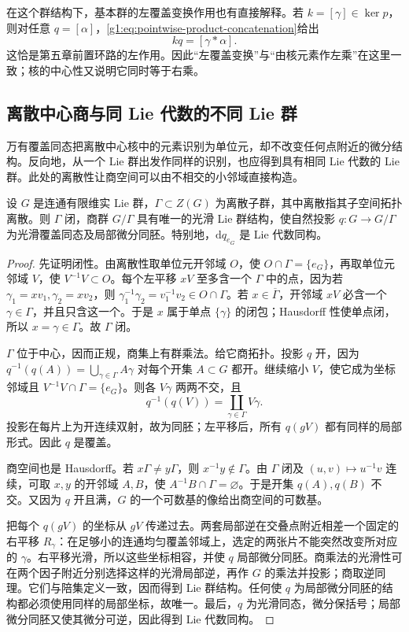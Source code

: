 

在这个群结构下，基本群的左覆盖变换作用也有直接解释。若 \(k=[\gamma]\in\ker p\)，则对任意 \(q=[\alpha]\)，\eqref{g1:eq:pointwise-product-concatenation}给出
\[
	kq=[\gamma*\alpha].
\]
这恰是第五章前置环路的左作用。因此“左覆盖变换”与“由核元素作左乘”在这里一致；核的中心性又说明它同时等于右乘。

\subsection{离散中心商与同 Lie 代数的不同 Lie 群}
\label{g1:subsec:1604:05}

万有覆盖同态把离散中心核中的元素识别为单位元，却不改变任何点附近的微分结构。反向地，从一个 Lie 群出发作同样的识别，也应得到具有相同 Lie 代数的 Lie 群。此处的离散性让商空间可以由不相交的小邻域直接构造。

\begin{proposition}
	\label{g1:prop:discrete-central-quotient}
	设 \(G\) 是连通有限维实 Lie 群，\(\Gamma\subset Z(G)\) 为离散子群，其中离散指其子空间拓扑离散。则 \(\Gamma\) 闭，商群 \(G/\Gamma\) 具有唯一的光滑 Lie 群结构，使自然投影 \(q:G\to G/\Gamma\) 为光滑覆盖同态及局部微分同胚。特别地，\(\mathrm{d}q_{e_G}\) 是 Lie 代数同构。
\end{proposition}
\begin{proof}
	先证明闭性。由离散性取单位元开邻域 \(O\)，使 \(O\cap\Gamma=\{e_G\}\)，再取单位元邻域 \(V\)，使 \(V^{-1}V\subset O\)。每个左平移 \(xV\) 至多含一个 \(\Gamma\) 中的点，因为若 \(\gamma_1=xv_1,\gamma_2=xv_2\)，则 \(\gamma_1^{-1}\gamma_2=v_1^{-1}v_2\in O\cap\Gamma\)。若 \(x\in\overline\Gamma\)，开邻域 \(xV\) 必含一个 \(\gamma\in\Gamma\)，并且只含这一个。于是 \(x\) 属于单点 \(\{\gamma\}\) 的闭包；Hausdorff 性使单点闭，所以 \(x=\gamma\in\Gamma\)。故 \(\Gamma\) 闭。

	\(\Gamma\) 位于中心，因而正规，商集上有群乘法。给它商拓扑。投影 \(q\) 开，因为 \(q^{-1}(q(A))=\bigcup_{\gamma\in\Gamma}A\gamma\) 对每个开集 \(A\subset G\) 都开。继续缩小 \(V\)，使它成为坐标邻域且 \(V^{-1}V\cap\Gamma=\{e_G\}\)。则各 \(V\gamma\) 两两不交，且
	\[
		q^{-1}(q(V))=\coprod_{\gamma\in\Gamma}V\gamma.
	\]
	投影在每片上为开连续双射，故为同胚；左平移后，所有 \(q(gV)\) 都有同样的局部形式。因此 \(q\) 是覆盖。

	商空间也是 Hausdorff。若 \(x\Gamma\ne y\Gamma\)，则 \(x^{-1}y\notin\Gamma\)。由 \(\Gamma\) 闭及 \((u,v)\mapsto u^{-1}v\) 连续，可取 \(x,y\) 的开邻域 \(A,B\)，使 \(A^{-1}B\cap\Gamma=\varnothing\)。于是开集 \(q(A),q(B)\) 不交。又因为 \(q\) 开且满，\(G\) 的一个可数基的像给出商空间的可数基。

	把每个 \(q(gV)\) 的坐标从 \(gV\) 传递过去。两套局部逆在交叠点附近相差一个固定的右平移 \(R_\gamma\)：在足够小的连通均匀覆盖邻域上，选定的两张片不能突然改变所对应的 \(\gamma\)。右平移光滑，所以这些坐标相容，并使 \(q\) 局部微分同胚。商乘法的光滑性可在两个因子附近分别选择这样的光滑局部逆，再作 \(G\) 的乘法并投影；商取逆同理。它们与陪集定义一致，因而得到 Lie 群结构。任何使 \(q\) 为局部微分同胚的结构都必须使用同样的局部坐标，故唯一。最后，\(q\) 为光滑同态，微分保括号；局部微分同胚又使其微分可逆，因此得到 Lie 代数同构。
\end{proof}

